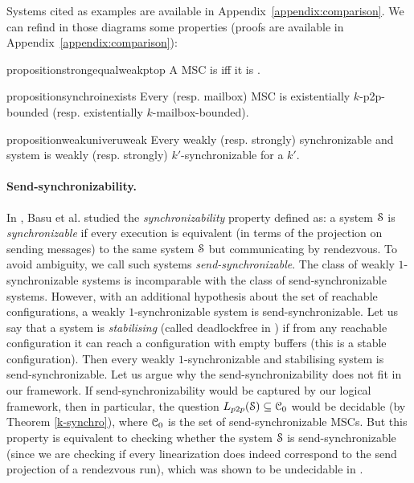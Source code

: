 \documentclass[a4paper,UKenglish,cleveref, autoref, thm-restate]{lipics-v2021}
\begin{document}
Systems cited as examples are available in Appendix~\ref{appendix:comparison}.
We can refind in those diagrams some properties (proofs are available in Appendix~\ref{appendix:comparison}):

\begin{restatable}{proposition}{strongequalweakptop}
\label{proposition:strong_equal_weak_p2p}
	A \pp MSC is  iff it is .
\end{restatable}


\begin{restatable}{proposition}{synchroinexists}
  \label{proposition:synchro_in_exists}
	Every   \pp (resp. mailbox) MSC is existentially $k$-p2p-bounded (resp. existentially $k$-mailbox-bounded).
\end{restatable}

\begin{restatable}{proposition}{weakuniveruweak}
  \label{proposition:weak_univer_uweak}
  Every weakly (resp. strongly) synchronizable and  system is weakly (resp. strongly) $k'$-synchronizable for a $k'$.
\end{restatable}


\paragraph*{Send-synchronizability.}
 In \cite{DBLP:conf/www/BasuB11,DBLP:conf/popl/BasuBO12}, Basu et al. studied the \emph{synchronizability} property defined as: a system $\mathcal{S}$ is \emph{synchronizable} if every execution is equivalent (in terms of the projection on sending messages) to the same system $\mathcal{S}$ but communicating by rendezvous. To avoid ambiguity, we call such systems \emph{send-synchronizable}.
The class of weakly $1$-synchronizable systems is incomparable with the class of send-synchronizable systems.
However, with an additional hypothesis about the set of reachable configurations, a weakly $1$-synchronizable system is send-synchronizable.
Let us say that a system is \emph{stabilising} (called deadlockfree in \cite{DBLP:journals/iandc/LohreyM04}) if from any reachable configuration it can reach a confi\-gu\-ration with empty buffers (this is a stable configuration). Then every weakly $1$-synchronizable and stabilising system is send-synchronizable. Let us argue why the send-synchronizability does not fit in our framework.
 If send-synchronizability would be captured by our logical framework, then in particular, the question $\ppL{\Sys} \subseteq \Class_0$ would be decidable (by Theorem \ref{k-synchro}), where $\mathcal{C}_0$ is the set of send-synchronizable MSCs. But this property is equivalent to checking whether the system $\mathcal{S}$ is send-synchronizable (since we are checking if every linearization does indeed correspond to the send projection of a rendezvous run), which was shown to be undecidable in \cite{DBLP:conf/icalp/FinkelL17}.
\end{document}
